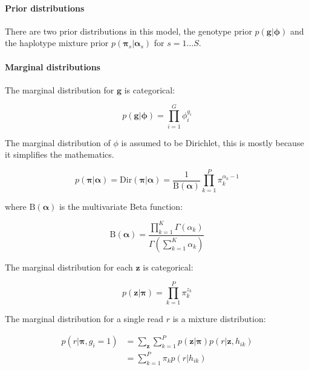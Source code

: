 \documentclass{article}
\begin{document}
\paragraph{Prior distributions}

There are two prior distributions in this model, the genotype prior $p(\boldsymbol{g} | \boldsymbol{\phi})$ and the haplotype mixture prior $p(\boldsymbol{\pi}_s | \boldsymbol{\alpha}_s)$ for $s = 1 \dots S$.

\paragraph{Marginal distributions}

The marginal distribution for $\boldsymbol{g}$ is categorical:

\begin{equation}
\label{eq:cnv_g_marginal}
    p(\boldsymbol{g} | \boldsymbol{\phi}) = \prod_{i = 1}^G \phi_i^{g_i}
\end{equation}

The marginal distribution of $\phi$ is assumed to be Dirichlet, this is mostly because it simplifies the mathematics.

\begin{equation}
\label{eq:cnv_pi_marginal}
    p(\boldsymbol{\pi} | \boldsymbol{\alpha}) = \text{Dir}(\boldsymbol{\pi} | \boldsymbol{\alpha}) = \frac{1}{\text{B}(\boldsymbol{\alpha})} \prod_{k = 1}^P \pi_k^{\alpha_k - 1}
\end{equation}

where $\text{B}(\boldsymbol{\alpha})$ is the multivariate Beta function:

\begin{equation}
\label{eq:beta_func}
    \text{B}(\boldsymbol{\alpha}) = \frac{\prod_{k = 1}^K \Gamma(\alpha_k)}{\Gamma(\sum_{k = 1}^K \alpha_k)}
\end{equation}

The marginal distribution for each $\boldsymbol{z}$ is categorical:

\begin{equation}
\label{eq:cnv_z_marginal}
    p(\boldsymbol{z} | \boldsymbol{\pi}) = \prod_{k = 1}^P \pi_k^{z_k}
\end{equation}

The marginal distribution for a single read $r$ is a mixture distribution:

\begin{align}
\label{eq:cnv_read_marginal}
 p(r | \boldsymbol{\pi}, g_i = 1) &= \sum_{\boldsymbol{z}} \sum^P_{k = 1} p(\boldsymbol{z} | \boldsymbol{\pi}) p(r | \boldsymbol{z}, h_{ik}) \\
 &= \sum^P_{k = 1} \pi_k p(r | h_{ik})
\end{align}
\end{document}

